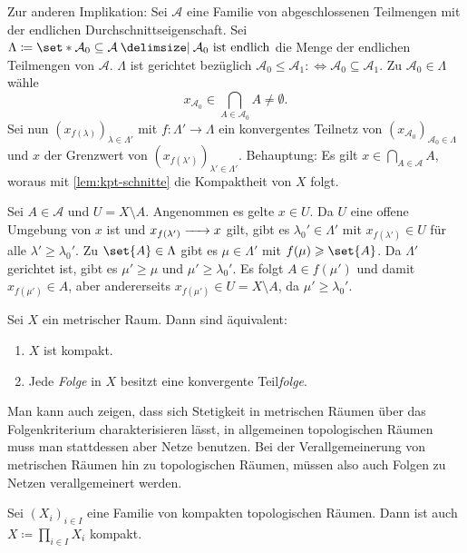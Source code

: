 \begin{beweis}
	Zur anderen Implikation:
	Sei $\mathcal{A}$ eine Familie von abgeschlossenen Teilmengen mit der endlichen Durchschnittseigenschaft. 
	Sei $\Lambda \coloneqq \set*{\mathcal{A}_0 \subseteq \mathcal{A} \given \mathcal{A}_0 \text{ ist endlich}}$ die Menge der endlichen Teilmengen von $\mathcal{A}$. 
	$\Lambda$ ist gerichtet bezüglich $\mathcal{A}_0 \le \mathcal{A}_1  :\Leftrightarrow \mathcal{A}_0 \subseteq \mathcal{A}_1$. Zu $\mathcal{A}_0 \in \Lambda $ wähle 
	\[
		x_{\mathcal{A}_0 } \in \bigcap_{A \in \mathcal{A}_0 }\! A \neq \emptyset.
	\]
	Sei nun $(x_{f(\lambda )})_{\lambda  \in \Lambda'}$ mit $f \colon \Lambda' \to \Lambda$ ein konvergentes Teilnetz von $(x_{\mathcal{A}_0 })_{\mathcal{A}_0 \in \Lambda}$ und $x$ der Grenzwert von $(x_{f(\lambda')})_{\lambda' \in \Lambda'}$. 
	Behauptung: Es gilt $x \in \bigcap_{A \in \mathcal{A}} A$, woraus mit \cref{lem:kpt-schnitte} die Kompaktheit von $X$ folgt.
	
	Sei $A \in \mathcal{A}$ und $U = X \setminus A$. 
	Angenommen es gelte $x \in U$. 
	Da $U$ eine offene Umgebung von $x$ ist und $x_{f(\lambda')} \grenzw{} x$ gilt, gibt es $\lambda_0' \in \Lambda'$ mit $x_{f(\lambda')} \in U$ für alle $\lambda' \ge \lambda_0'$. 
	Zu $\set{A} \in \Lambda$ gibt es $\mu \in \Lambda'$ mit $f(\mu) \ge \set{A}$. 
	Da $\Lambda '$ gerichtet ist, gibt es $\mu' \ge \mu$ und $\mu' \ge \lambda_0'$. 
	Es folgt $A \in f(\mu')$ und damit $x_{f(\mu')} \in A$, aber andererseits $x_{f(\mu')} \in U  = X \setminus A$, da $\mu' \ge \lambda_0'$. \light
\end{beweis}

\begin{bemerkung}[{name=[Kompaktheit in metrischen Räumen]}]
Sei $X$ ein metrischer Raum. Dann sind äquivalent:
\begin{enumerate}[(1)]
	\item $X$ ist kompakt.
	\item Jede \emph{Folge} in $X$ besitzt eine konvergente Teil\emph{folge}.
\end{enumerate}
Man kann auch zeigen, dass sich Stetigkeit in metrischen Räumen über das Folgenkriterium charakterisieren lässt, in allgemeinen topologischen Räumen muss man stattdessen aber Netze benutzen.
Bei der Verallgemeinerung von metrischen Räumen hin zu topologischen Räumen, müssen also auch Folgen zu Netzen verallgemeinert werden.
\end{bemerkung}

\begin{satz}[{name={Tychonov}},label=satz:tychonov]
	Sei $(X_i)_{i \in I}$ eine Familie von kompakten topologischen Räumen. Dann ist auch $X \coloneqq \prod_{i \in I} X_i$ kompakt.
\end{satz}

